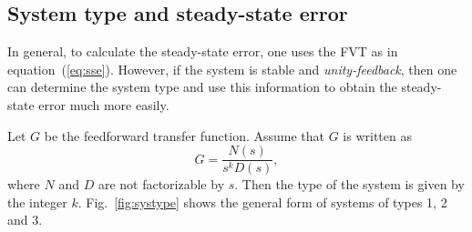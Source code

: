 \documentclass[a4paper,11pt]{report}
\theoremstyle{definition}
\begin{document}
\subsection{System type and steady-state error}

In general, to calculate the steady-state error, one uses the FVT as
in equation~(\ref{eq:sse}). However, if the system is stable and
\emph{unity-feedback}, then one can determine the system type and use
this information to obtain the steady-state error much more easily.

Let $G$ be the feedforward transfer function. Assume that $G$ is
written as
\[
G=\frac{N(s)}{s^kD(s)},
\]
where $N$ and $D$ are not factorizable by $s$. Then the type of the
system is given by the integer $k$. Fig.~\ref{fig:systype} shows the
general form of systems of types 1, 2 and 3.
\end{document}
